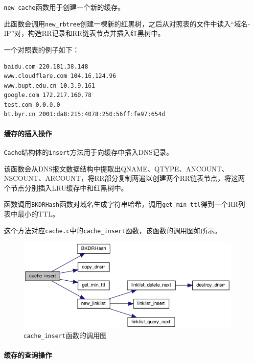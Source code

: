 \documentclass[lang=cn,11pt,a4paper,cite=authornum]{paper}
\begin{document}
\texttt{new_cache}函数用于创建一个新的缓存。

此函数会调用\texttt{new_rbtree}创建一棵新的红黑树，之后从对照表的文件中读入“域名-IP”对，构造RR记录和RR链表节点并插入红黑树中。

一个对照表的例子如下：

\label{iptable}
\begin{code}
\begin{verbatim}
baidu.com 220.181.38.148
www.cloudflare.com 104.16.124.96
www.bupt.edu.cn 10.3.9.161
google.com 172.217.160.78
test.com 0.0.0.0
bt.byr.cn 2001:da8:215:4078:250:56ff:fe97:654d
\end{verbatim}
\end{code}

\paragraph{缓存的插入操作} 

\texttt{Cache}结构体的\texttt{insert}方法用于向缓存中插入DNS记录。

该函数会从DNS报文数据结构中提取出QNAME、QTYPE、ANCOUNT、NSCOUNT、ARCOUNT，将RR部分复制两遍以创建两个RR链表节点，将这两个节点分别插入LRU缓存中和红黑树中。

函数调用\texttt{BKDRHash}函数对域名生成字符串哈希，调用\texttt{get_min_ttl}得到一个RR列表中最小的TTL。

这个方法对应\texttt{cache.c}中的\texttt{cache_insert}函数，该函数的调用图如所示。

\begin{figure}[htbp]

    \centering
    \includegraphics[width=0.8\linewidth]{./APIdoc/cache_8c_a6ced4e1f620d2e750fb0c2c049962fa8_cgraph.png}
    \caption{\texttt{cache_insert}函数的调用图\label{fig:cache_insert_call}}

\end{figure}

\paragraph{缓存的查询操作}
\end{document}
